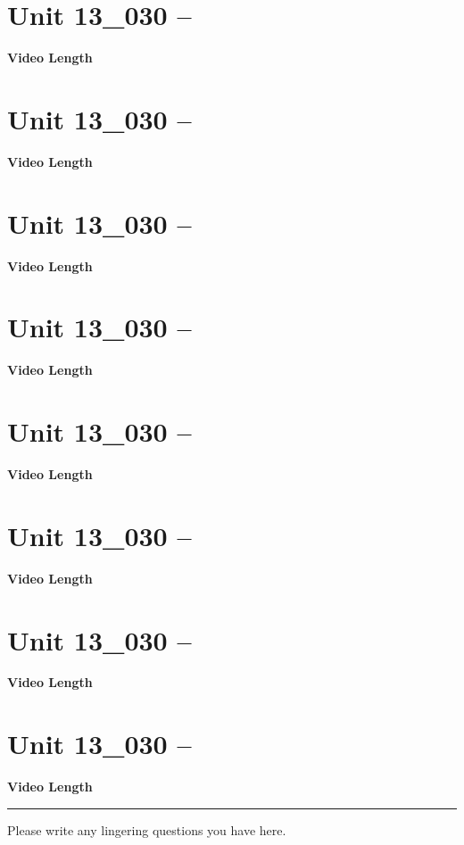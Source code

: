\documentclass[letterpaper,12pt]{exam}
\newcommand{\unit}{Unit 13}
\begin{document}
\begin{questions}
\section*{\unit\_030 -- } 
\par{\selectfont\textbf{Video Length }}

\section*{\unit\_030 -- } 
\par{\selectfont\textbf{Video Length }}

\section*{\unit\_030 -- } 
\par{\selectfont\textbf{Video Length }}

\section*{\unit\_030 -- } 
\par{\selectfont\textbf{Video Length }}

\section*{\unit\_030 -- } 
\par{\selectfont\textbf{Video Length }}

\section*{\unit\_030 -- } 
\par{\selectfont\textbf{Video Length }}

\section*{\unit\_030 -- } 
\par{\selectfont\textbf{Video Length }}

\section*{\unit\_030 -- } 
\par{\selectfont\textbf{Video Length }}




\begin{center}
    \rule{0.5\textwidth}{.4pt}
\end{center}
Please write any lingering questions you have here.
\end{questions}
\end{document}
